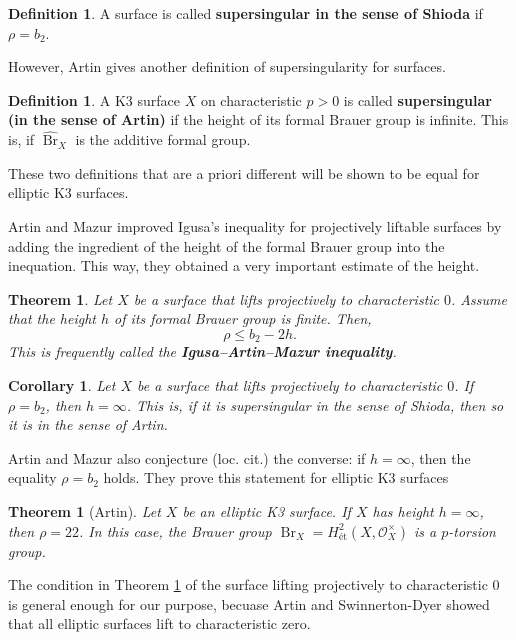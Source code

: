 \documentclass{report}
\DeclareMathOperator{\Br}{Br}
\newtheorem{theorem}[equation]{Theorem}
\newtheorem{corollary}[equation]{Corollary}
\theoremstyle{definition}
\newtheorem{definition}[equation]{Definition}
\begin{document}
\begin{definition}
A surface is called \textbf{supersingular in the sense of Shioda} if $\rho=b_2$.
\end{definition}

However, Artin \cite[Definition~0.3]{artin1974supersingular} gives another definition of supersingularity for surfaces.

\begin{definition}
A K3 surface $X$ on characteristic $p>0$ is called \textbf{supersingular (in the sense of Artin)} if the height of its formal Brauer group is infinite. This is, if $\widehat{\Br}_X$ is the additive formal group.
\end{definition}

These two definitions that are a priori different will be shown to be equal for elliptic K3 surfaces.

Artin and Mazur \cite[Theorem~0.1]{artin1974supersingular} improved Igusa's inequality for projectively liftable surfaces by adding the ingredient of the height of the formal Brauer group into the inequation. This way, they obtained a very important estimate of the height.

\begin{theorem}
\label{the:igusa-artin-mazur}
Let $X$ be a surface that lifts projectively to characteristic $0$. Assume that the height $h$ of its formal Brauer group is finite. Then,
\[\rho\leq b_2-2h.\]
This is frequently called the \textbf{Igusa--Artin--Mazur inequality}.
\end{theorem}

\begin{corollary}
Let $X$ be a surface that lifts projectively to characteristic $0$. If $\rho=b_2$, then $h=\infty$. This is, if it is supersingular in the sense of Shioda, then so it is in the sense of Artin.
\end{corollary}

Artin and Mazur also conjecture (loc. cit.) the converse: if $h=\infty$, then the equality $\rho=b_2$ holds. They prove this statement for elliptic K3 surfaces \cite[Theorem~1.7]{artin1974supersingular}

\begin{theorem}[Artin]
Let $X$ be an elliptic K3 surface. If $X$ has height $h=\infty$, then $\rho=22$. In this case, the Brauer group $\Br_X=H_{\text{\'{e}t}}^2(X,\mathcal{O}_X^{\times})$ is a $p$-torsion group.
\end{theorem}

The condition in Theorem \ref{the:igusa-artin-mazur} of the surface lifting projectively to characteristic $0$ is general enough for our purpose, becuase Artin and Swinnerton-Dyer \cite[Proposition~2.5]{artin1973shafarevich} showed that all elliptic surfaces lift to characteristic zero.
\end{document}
